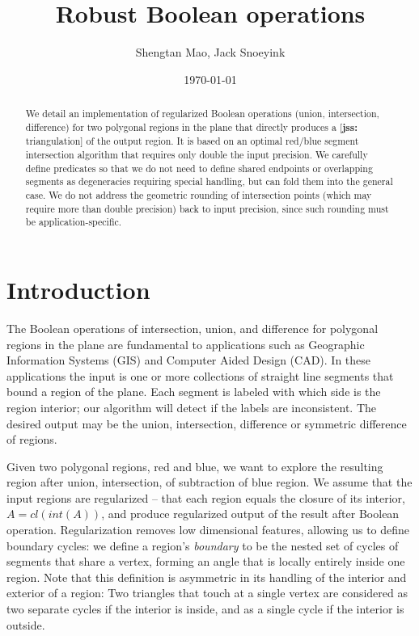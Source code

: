 \documentclass[11pt]{article}
\title{Robust Boolean operations}
\author{Shengtan Mao, Jack Snoeyink}
\date{\today}
\def\sm#1{{\footnotesize [{\bf jss:} #1]}}
\begin{document}
\maketitle
\begin{abstract}
We detail an implementation of regularized Boolean operations (union, intersection, difference) for two polygonal regions in the plane that directly produces a \sm{triangulation} of the output region. 
It is based on an optimal red/blue segment intersection algorithm that requires only double the input precision.  
We carefully define predicates so that we do not need to define shared endpoints or overlapping segments as degeneracies requiring special handling, but can fold them into the general case.  
We do not address the geometric rounding of intersection points (which may require more than double precision) back to input precision, since such rounding must be application-specific.
\end{abstract}
\section{Introduction}

The Boolean operations of intersection, union, and difference for polygonal regions in the plane are fundamental to applications such as Geographic Information Systems (GIS)
and Computer Aided Design (CAD).  
In these applications the input is one or more collections of straight line segments that bound a region of the plane.
Each segment is labeled with which side is the region interior; our algorithm will detect if the labels are inconsistent.
The desired output may be the union, intersection, difference or symmetric difference of regions. 

Given two polygonal regions, red and blue, we want to explore the resulting region after union, intersection, of subtraction of blue region.
We assume that the input regions are regularized -- that each region equals the closure of its interior, $A= \textit{cl}(\textit{int}(A))$, and produce regularized output of the result after Boolean operation. 
Regularization removes low dimensional features, allowing us to define boundary cycles: we define a region's \textit{boundary} to be the nested set of cycles of segments that share a vertex, forming an angle that is locally entirely inside one region.
Note that this definition is asymmetric in its handling of the interior and exterior of a region:  Two triangles that touch at a single vertex are considered as two separate cycles if the interior is inside, and as a single cycle if the interior is outside.
\end{document}
